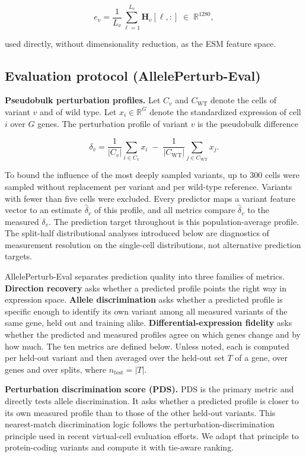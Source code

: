 \documentclass[11pt,letterpaper]{article}
\begin{document}
\[
e_v = \frac{1}{L_v}\sum_{\ell=1}^{L_v} \mathbf{H}_v[\ell, :] \;\in\; \mathbb{R}^{1280},
\]

used directly, without dimensionality reduction, as the ESM feature space.

\subsection*{Evaluation protocol (AllelePerturb-Eval)}

\textbf{Pseudobulk perturbation profiles.} Let $C_v$ and $C_{\mathrm{WT}}$ denote the cells of variant $v$ and of wild type. Let $x_i \in \mathbb{R}^{G}$ denote the standardized expression of cell $i$ over $G$ genes. The perturbation profile of variant $v$ is the pseudobulk difference

\[
\delta_v = \frac{1}{|C_v|}\sum_{i \in C_v} x_i \;-\; \frac{1}{|C_{\mathrm{WT}}|}\sum_{j \in C_{\mathrm{WT}}} x_j.
\]

To bound the influence of the most deeply sampled variants, up to 300 cells were sampled without replacement per variant and per wild-type reference. Variants with fewer than five cells were excluded. Every predictor maps a variant feature vector to an estimate $\hat{\delta}_v$ of this profile, and all metrics compare $\hat{\delta}_v$ to the measured $\delta_v$. The prediction target throughout is this population-average profile. The split-half distributional analyses introduced below are diagnostics of measurement resolution on the single-cell distributions, not alternative prediction targets.

AllelePerturb-Eval separates prediction quality into three families of metrics. \textbf{Direction recovery} asks whether a predicted profile points the right way in expression space. \textbf{Allele discrimination} asks whether a predicted profile is specific enough to identify its own variant among all measured variants of the same gene, held out and training alike. \textbf{Differential-expression fidelity} asks whether the predicted and measured profiles agree on which genes change and by how much. The ten metrics are defined below. Unless noted, each is computed per held-out variant and then averaged over the held-out set $T$ of a gene, over genes and over splits, where $n_{\mathrm{test}} = |T|$.

\textbf{Perturbation discrimination score (PDS).} PDS is the primary metric and directly tests allele discrimination. It asks whether a predicted profile is closer to its own measured profile than to those of the other held-out variants. This nearest-match discrimination logic follows the perturbation-discrimination principle used in recent virtual-cell evaluation efforts\cite{AIVirtualCell2024,Systema,VirtualCellChallenge2025}. We adapt that principle to protein-coding variants and compute it with tie-aware ranking.
\end{document}

